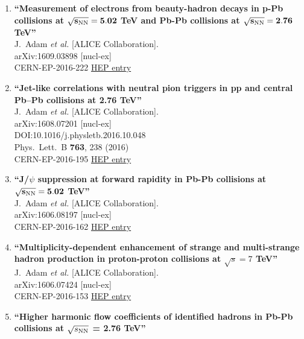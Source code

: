 \begin{enumerate}
\item%
{\bf ``Measurement of electrons from beauty-hadron decays in p-Pb collisions at $\mathbf{\sqrt{s_{\rm NN}}=5.02}$ TeV and Pb-Pb collisions at $\mathbf{\sqrt{s_{\rm NN}}=2.76}$ TeV''}
  \\{}J.~Adam {\it et al.} [ALICE Collaboration].
  \\{}arXiv:1609.03898 [nucl-ex]
  \\{}CERN-EP-2016-222
\href{http://inspirehep.net/record/1486391}{HEP entry}

\item%
{\bf ``Jet-like correlations with neutral pion triggers in pp and central Pb–Pb collisions at 2.76 TeV''}
  \\{}J.~Adam {\it et al.} [ALICE Collaboration].
  \\{}arXiv:1608.07201 [nucl-ex]
  \\{}DOI:10.1016/j.physletb.2016.10.048
  \\{}Phys.\ Lett.\ B {\bf 763}, 238 (2016)
  \\{}CERN-EP-2016-195
\href{http://inspirehep.net/record/1483164}{HEP entry}
\item%
{\bf ``J/$\psi$ suppression at forward rapidity in Pb-Pb collisions at $\mathbf{\sqrt{s_{{\rm NN}}} = 5.02}$ TeV''}
  \\{}J.~Adam {\it et al.} [ALICE Collaboration].
  \\{}arXiv:1606.08197 [nucl-ex]
  \\{}CERN-EP-2016-162
\href{http://inspirehep.net/record/1472319}{HEP entry}
\item%
{\bf ``Multiplicity-dependent enhancement of strange and multi-strange hadron production in proton-proton collisions at $\sqrt{s} = 7$ TeV''}
  \\{}J.~Adam {\it et al.} [ALICE Collaboration].
  \\{}arXiv:1606.07424 [nucl-ex]
  \\{}CERN-EP-2016-153
\href{http://inspirehep.net/record/1471838}{HEP entry}
\item%
{\bf ``Higher harmonic flow coefficients of identified hadrons in Pb-Pb collisions at $\sqrt{s_{\rm NN}}$ = 2.76 TeV''}

\end{enumerate}
